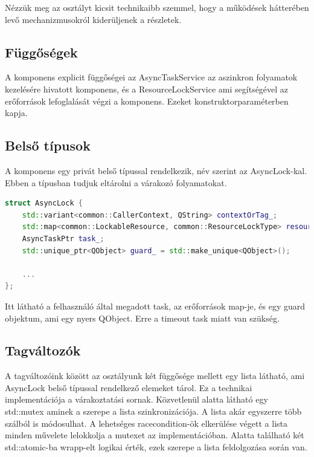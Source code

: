 Nézzük meg az osztályt kicsit technikaibb szemmel, hogy a működések hátterében levő mechanizmusokról kiderüljenek a részletek.

\subsection{Függőségek}

A komponens explicit függőségei az AsyncTaskService az aszinkron folyamatok kezelésére hivatott komponens, és a ResourceLockService ami segítségével az erőforrások lefoglalását végzi a komponens. Ezeket konstruktorparaméterben kapja.

\subsection{Belső típusok}

A komponens egy privát belső típussal rendelkezik, név szerint az AsyncLock-kal. Ebben a típusban tudjuk eltárolni a várakozó folyamatokat.

\begin{lstlisting}[language={C++}]
struct AsyncLock {
    std::variant<common::CallerContext, QString> contextOrTag_;
    std::map<common::LockableResource, common::ResourceLockType> resources_;
    AsyncTaskPtr task_;
    std::unique_ptr<QObject> guard_ = std::make_unique<QObject>();

    ...
};
\end{lstlisting}

Itt látható a felhasználó által megadott task, az erőforrások map-je, és egy guard objektum, ami egy nyers QObject. Erre a timeout task miatt van szükség.

\subsection{Tagváltozók}

A tagváltozóink között az osztályunk két függősége mellett egy lista látható, ami AsyncLock belső típussal rendelkező elemeket tárol. Ez a technikai implementációja a várakoztatási sornak. Közvetlenül alatta látható egy std::mutex aminek a szerepe a lista szinkronizációja. A lista akár egyszerre több szálból is módosulhat. A lehetséges racecondition-ök elkerülése végett a lista minden művelete lelokkolja a mutexet az implementációban. Alatta található két std::atomic-ba wrapp-elt logikai érték, ezek szerepe a lista feldolgozása során van.

